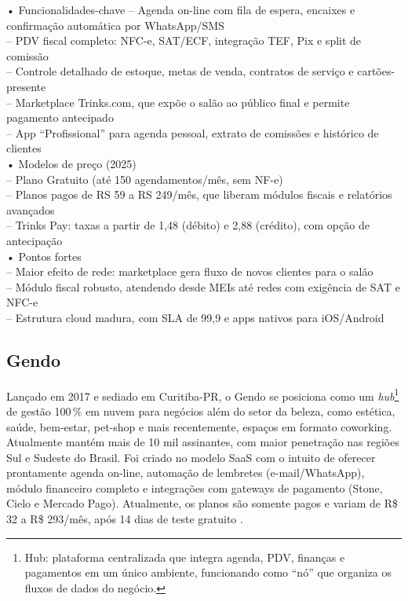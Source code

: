 • Funcionalidades-chave
– Agenda on-line com fila de espera, encaixes e confirmação automática por WhatsApp/SMS\\
– PDV fiscal completo: NFC-e, SAT/ECF, integração TEF, Pix e split de comissão\\
– Controle detalhado de estoque, metas de venda, contratos de serviço e cartões-presente\\
– Marketplace Trinks.com, que expõe o salão ao público final e permite pagamento antecipado\\
– App “Profissional” para agenda pessoal, extrato de comissões e histórico de clientes\\

• Modelos de preço (2025)\\
– Plano Gratuito (até 150 agendamentos/mês, sem NF-e)\\
– Planos pagos de RS 59 a RS 249/mês, que liberam módulos fiscais e relatórios avançados\\
– Trinks Pay: taxas a partir de 1,48  (débito) e 2,88  (crédito), com opção de antecipação\\

• Pontos fortes\\
– Maior efeito de rede: marketplace gera fluxo de novos clientes para o salão\\
– Módulo fiscal robusto, atendendo desde MEIs até redes com exigência de SAT e NFC-e\\
– Estrutura cloud madura, com SLA de 99,9  e apps nativos para iOS/Android\\


\subsection{Gendo}

Lançado em 2017 e sediado em Curitiba-PR, o Gendo se posiciona como um \emph{hub}\footnote{Hub: plataforma centralizada que integra agenda, PDV, finanças e pagamentos em um único ambiente, funcionando como “nó” que organiza os fluxos de dados do negócio.} de gestão 100\,\% em nuvem para negócios além do setor da beleza, como estética, saúde, bem-estar, pet-shop e mais recentemente, espaços em formato coworking. 
Atualmente mantém mais de 10 mil assinantes, com maior penetração nas regiões Sul e Sudeste do Brasil. Foi criado no modelo SaaS com o intuito de oferecer prontamente agenda on-line, automação de lembretes (e-mail/WhatsApp), módulo financeiro completo e integrações com gateways de pagamento (Stone, Cielo e Mercado Pago). Atualmente, os planos são somente pagos e variam de R\$ 32 a R\$ 293/mês, após 14 dias de teste gratuito \cite{Gendo}.

